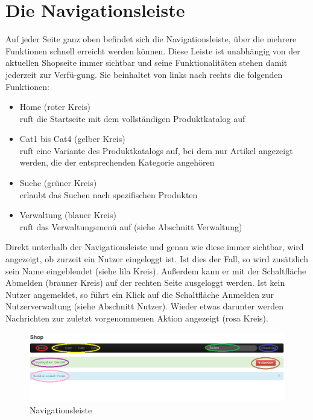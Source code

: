\section{Die Navigationsleiste}
Auf jeder Seite ganz oben befindet sich die Navigationsleiste, über die mehrere Funktionen schnell erreicht werden können. Diese Leiste ist unabhängig von der aktuellen Shopseite immer sichtbar und seine Funktionalitäten stehen damit jederzeit zur Ver\-fü-gung. Sie beinhaltet von links nach rechts die folgenden Funktionen:
\begin{itemize}
  \item Home (roter Kreis) \\
        ruft die Startseite mit dem vollständigen Produktkatalog auf
  \vspace*{-0.5em}
  \item Cat1 bis Cat4 (gelber Kreis) \\
        ruft eine Variante des Produktkatalogs auf, bei dem nur Artikel angezeigt werden, die der entsprechenden Kategorie angehören        
  \vspace*{-0.5em}
  \item Suche (grüner Kreis) \\
        erlaubt das Suchen nach spezifischen Produkten
  \vspace*{-0.5em}
  \item Verwaltung (blauer Kreis) \\
        ruft das Verwaltungsmenü auf (siehe Abschnitt Verwaltung)
\end{itemize}
Direkt unterhalb der Navigationsleiste und genau wie diese immer sichtbar, wird angezeigt, ob zurzeit ein Nutzer eingeloggt ist. Ist dies der Fall, so wird zusätzlich sein Name eingeblendet  (siehe lila Kreis). Außerdem  kann er mit der Schaltfläche Abmelden (brauner Kreis) auf der rechten Seite ausgeloggt werden.  Ist kein Nutzer angemeldet, so führt ein Klick auf die Schaltfläche Anmelden zur Nutzerverwaltung (siehe Abschnitt Nutzer). 
Wieder etwas darunter werden Nachrichten zur zuletzt vorgenommenen Aktion angezeigt (rosa Kreis).

\begin{figure}[h!]
  \centering
  \includegraphics[width=\textwidth]{img/Navi.png}
  \caption{Navigationsleiste}
  \label{fig:Navigationsleiste}
\end{figure}


